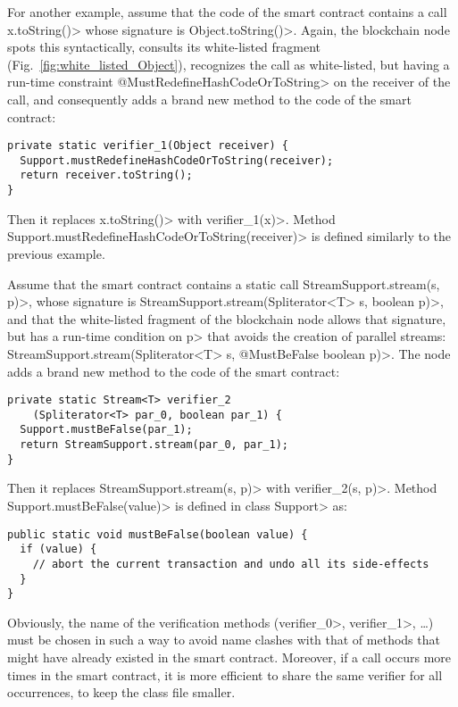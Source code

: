 For another example, assume that the code of the smart contract
contains a call \<x.toString()> whose signature is
\<Object.toString()>.
Again, the blockchain node spots this syntactically,
consults its white-listed fragment (Fig.~\ref{fig:white_listed_Object}),
recognizes the call as
white-listed, but having a run-time constraint \<@MustRedefineHashCodeOrToString> on
the receiver of the call, and consequently
adds a brand new method to the code of the smart contract:
%
\begin{verbatim}
private static verifier_1(Object receiver) {
  Support.mustRedefineHashCodeOrToString(receiver);
  return receiver.toString();
}
\end{verbatim}
%
Then it replaces \<x.toString()> with \<verifier\_1(x)>.
Method \<Support.mustRedefineHashCodeOrToString(receiver)> is defined
similarly to the previous example.

Assume that the smart contract contains a static call
\<StreamSupport.stream(s, p)>, whose signature is
\<StreamSupport.stream(Spliterator$\text{<}$T$\text{>}$ s, boolean p)>,
and that the white-listed fragment of the blockchain node allows that signature,
but has a run-time condition on \<p> that avoids the creation of parallel streams:
\<StreamSupport.stream(Spliterator$\text{<}$T$\text{>}$ s, @MustBeFalse boolean p)>.
The node adds
a brand new method to the code of the smart contract:
%
\begin{verbatim}
private static Stream<T> verifier_2
    (Spliterator<T> par_0, boolean par_1) {
  Support.mustBeFalse(par_1);
  return StreamSupport.stream(par_0, par_1);
}
\end{verbatim}
%
Then it replaces \<StreamSupport.stream(s, p)> with \<verifier\_2(s, p)>.
Method \<Support.mustBeFalse(value)> is defined in class \<Support> as:
%
\begin{verbatim}
public static void mustBeFalse(boolean value) {
  if (value) {
    // abort the current transaction and undo all its side-effects
  }
}
\end{verbatim}

Obviously, the name of the verification methods (\<verifier\_0>, \<verifier\_1>, \ldots)
must be chosen in such a way to avoid name clashes with that of methods that might
have already existed in the smart contract. Moreover, if a call occurs more times
in the smart contract, it is more efficient to share the same verifier for all
occurrences, to keep the class file smaller.
